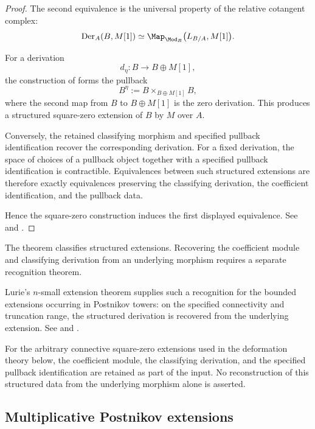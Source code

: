 \begin{proof}
The second equivalence is the universal property of the relative
cotangent complex:
\[
    \operatorname{Der}_A(B,M[1])
    \simeq
    \Map_{\Mod_B}
    \bigl(
        L_{B/A},
        M[1]
    \bigr).
\]

For a derivation
\[
    d_\eta
    \colon
    B
    \longrightarrow
    B\oplus M[1],
\]
the construction of
 forms the pullback
\[
    B^\eta
    :=
    B
    \times_{B\oplus M[1]}
    B,
\]
where the second map from $B$ to $B\oplus M[1]$ is the zero
derivation. This produces a structured square-zero extension of $B$ by
$M$ over $A$.

Conversely, the retained classifying morphism and specified pullback
identification recover the corresponding derivation. For a fixed
derivation, the space of choices of a pullback object together with a
specified pullback identification is contractible. Equivalences between
such structured extensions are therefore exactly equivalences preserving
the classifying derivation, the coefficient identification, and the
pullback data.

Hence the square-zero construction induces the first displayed
equivalence. See
\cite[Section~7.4.1]{LurieHigherAlgebra} and
\cite[Section~3.1]{LurieDAGIV}.
\end{proof}

\begin{remark}
\label{rem:recognition-underlying-square-zero}
The theorem classifies structured extensions. Recovering the coefficient
module and classifying derivation from an underlying morphism requires a
separate recognition theorem.

Lurie's \(n\)-small extension theorem supplies such a recognition for
the bounded extensions occurring in Postnikov towers: on the specified
connectivity and truncation range, the structured derivation is recovered
from the underlying extension. See
\cite[Theorem~3.17 and Corollaries~3.18--3.19]{LurieDAGIV} and
\cite[Section~7.4.1]{LurieHigherAlgebra}.

For the arbitrary connective square-zero extensions used in the
deformation theory below, the coefficient module, the classifying
derivation, and the specified pullback identification are retained as
part of the input. No reconstruction of this structured data from the
underlying morphism alone is asserted.
\end{remark}

\subsection{Multiplicative Postnikov extensions}


